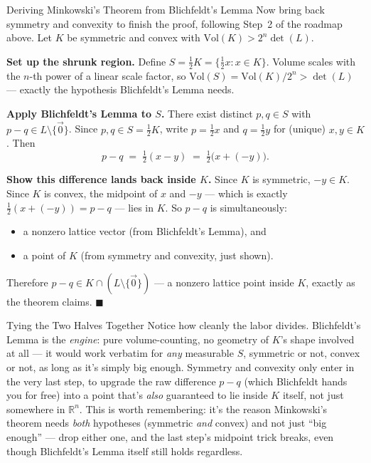 \begin{rmkbox}{Deriving Minkowski's Theorem from Blichfeldt's Lemma}
Now bring back symmetry and convexity to finish the proof, following Step~2 of the roadmap above. Let $K$ be symmetric and convex with $\mathrm{Vol}(K) > 2^n\det(L)$.

\textbf{Set up the shrunk region.} Define $S = \tfrac{1}{2}K = \{\tfrac12 x : x \in K\}$. Volume scales with the $n$-th power of a linear scale factor, so $\mathrm{Vol}(S) = \mathrm{Vol}(K)/2^n > \det(L)$ --- exactly the hypothesis Blichfeldt's Lemma needs.

\textbf{Apply Blichfeldt's Lemma to $S$.} There exist distinct $p, q \in S$ with $p - q \in L\setminus\{\vec 0\}$. Since $p,q \in S = \tfrac12 K$, write $p = \tfrac12 x$ and $q = \tfrac12 y$ for (unique) $x, y \in K$. Then
$$
p - q \;=\; \tfrac12(x - y) \;=\; \tfrac12\big(x + (-y)\big).
$$

\textbf{Show this difference lands back inside $K$.} Since $K$ is symmetric, $-y \in K$. Since $K$ is convex, the midpoint of $x$ and $-y$ --- which is exactly $\tfrac12(x+(-y)) = p-q$ --- lies in $K$. So $p - q$ is simultaneously:
\begin{itemize}[leftmargin=*]
  \item a nonzero lattice vector (from Blichfeldt's Lemma), and
  \item a point of $K$ (from symmetry and convexity, just shown).
\end{itemize}
Therefore $p - q \in K \cap (L\setminus\{\vec 0\})$ --- a nonzero lattice point inside $K$, exactly as the theorem claims. $\blacksquare$
\end{rmkbox}

\begin{rmkbox}{Tying the Two Halves Together}
Notice how cleanly the labor divides. Blichfeldt's Lemma is the \emph{engine}: pure volume-counting, no geometry of $K$'s shape involved at all --- it would work verbatim for \emph{any} measurable $S$, symmetric or not, convex or not, as long as it's simply big enough. Symmetry and convexity only enter in the very last step, to upgrade the raw difference $p-q$ (which Blichfeldt hands you for free) into a point that's \emph{also} guaranteed to lie inside $K$ itself, not just somewhere in $\mathbb{R}^n$. This is worth remembering: it's the reason Minkowski's theorem needs \emph{both} hypotheses (symmetric \emph{and} convex) and not just ``big enough'' --- drop either one, and the last step's midpoint trick breaks, even though Blichfeldt's Lemma itself still holds regardless.
\end{rmkbox}

